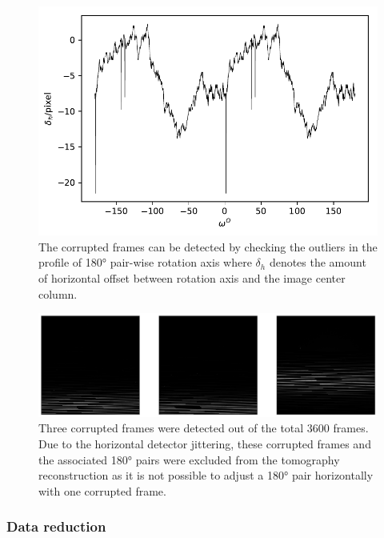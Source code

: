 \documentclass[12pt]{scrartcl}
\newcommand{\myscale}{1}
\begin{document}
\renewcommand{\myscale}{1}
\begin{figure}
\centering
\includegraphics[scale=\myscale]{corruptedFrameDetection}
\caption{
The corrupted frames can be detected by checking the outliers in the profile of \ang{180} pair-wise rotation axis where $\delta_h$ denotes the amount of horizontal offset between rotation axis and the image center column.
}\label{fig: corrupted frame detection}
\end{figure} 

\renewcommand{\myscale}{0.5}
\begin{figure}
\centering
\includegraphics[scale=\myscale]{corruptedFrames}
\caption{
Three corrupted frames were detected out of the total 3600 frames.
Due to the horizontal detector jittering, these corrupted frames and the associated \ang{180} pairs were excluded from the tomography reconstruction as it is not possible to adjust a \ang{180} pair horizontally with one corrupted frame.
}\label{fig: corrupted frames}
\end{figure}

\subsubsection{Data reduction}\label{sec: data reduction}
\end{document}
